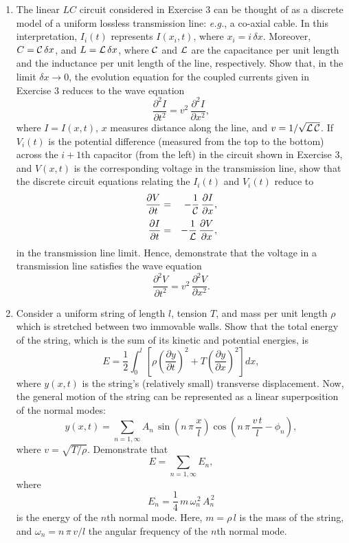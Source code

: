 {\begin{enumerate}
\item The linear $LC$ circuit considered in Exercise 3 can be thought of as a discrete 
model of a uniform lossless transmission line: {\em e.g.}, a co-axial cable. In this interpretation,
$I_i(t)$ represents $I(x_i,t)$, where $x_i=i\,\delta x$. Moreover, $C={\cal C}\,\delta x$, and
$L={\cal L}\,\delta x$, where ${\cal C}$ and ${\cal L}$ are the capacitance per unit length and the
inductance per unit length of the line, respectively. Show that, in the limit $\delta x\rightarrow 0$,
the evolution equation for the coupled currents given in Exercise 3 reduces to
the wave equation
$$
\frac{\partial^2 I}{\partial t^2} = v^2\,\frac{\partial^2 I}{\partial x^2},
$$
where $I=I(x,t)$, $x$ measures distance along the line, and $v=1/\sqrt{{\cal L}\,{\cal C}}$. 
If $V_i(t)$ is the potential difference (measured from the top to the bottom) across the $i+1$th capacitor (from the left) in the
circuit shown in Exercise 3, and $V(x,t)$ is the corresponding voltage in the transmission line, show that the discrete circuit equations relating the $I_i(t)$ and $V_i(t)$
reduce to 
\begin{eqnarray}
\frac{\partial V}{\partial t} &=&-\frac{1}{{\cal C}}\,\frac{\partial I}{\partial x},\nonumber\\[0.5ex]
\frac{\partial I}{\partial t} &=& - \frac{1}{{\cal L}}\,\frac{\partial V}{\partial x},\nonumber
\end{eqnarray}
in the transmission line limit. Hence, demonstrate that the voltage in a transmission
line satisfies the wave equation
$$
\frac{\partial^2 V}{\partial t^2} = v^2\,\frac{\partial^2 V}{\partial x^2}.
$$

\item Consider a uniform string of length $l$, tension $T$, and mass per unit length $\rho$ which is stretched between two immovable walls. Show that the total energy
of the string, which is the sum of its kinetic and potential energies, is
$$
E = \frac{1}{2}\int_0^l\left[\rho\left(\frac{\partial y}{\partial t}\right)^2
+ T\left(\frac{\partial y}{\partial x}\right)^2\right] dx,
$$
where $y(x,t)$ is the string's (relatively small) transverse displacement. Now, the general motion of
the string can be represented as a linear superposition of the normal modes:
$$
y(x,t) = \sum_{n=1,\infty}A_n\,\sin\left(n\,\pi\,\frac{x}{l}\right)\cos\left(n\,\pi\,\frac{v\,t}{l}-\phi_n\right),
$$
where $v=\sqrt{T/\rho}$. Demonstrate that
$$
E = \sum_{n=1,\infty} E_n,
$$
where
$$
E_n = \frac{1}{4}\,m\,\omega_n^{\,2}\,A_n^{\,2}
$$
is the energy of the $n$th normal mode. Here, $m=\rho\,l$ is the mass of the
string, and $\omega_n = n\,\pi\,v/l$ the angular frequency of the $n$th normal
mode.

\end{enumerate}}

